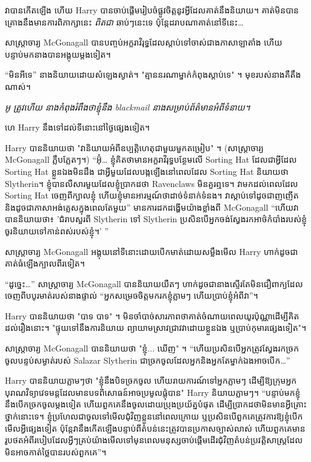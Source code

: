 វាបានកើតឡើង ហើយ Harry បានចាប់ផ្តើមរៀបចំផ្លូវចិត្តនូវអ្វីដែលគាត់នឹងនិយាយ។ គាត់​មិន​បាន​គ្រោង​នឹង​មាន​ការ​ពិភាក្សា​នេះ \emph{ពិតជា​} ឆាប់​ៗ​នេះ​ទេ ប៉ុន្តែ​ដរាបណា​គាត់​នៅ​ទីនេះ…

សាស្ត្រាចារ្យ McGonagall បានបញ្ចប់អក្ខរាវិរុទ្ធដែលស្តាប់ទៅចាស់ជាងភាសាឡាតាំង ហើយបន្ទាប់មកនាងបានអង្គុយម្តងទៀត។

“មិនអីទេ” នាងនិយាយដោយសំឡេងស្ងាត់។ "គ្មាននរណាម្នាក់កំពុងស្តាប់ទេ" ។ មុខរបស់នាងគឺតឹងណាស់។

\emph{អូ ត្រូវហើយ នាងកំពុងរំពឹងថាខ្ញុំនឹង blackmail នាងសម្រាប់ព័ត៌មានអំពីទំនាយ។}

ហេ Harry នឹងទៅដល់ទីនោះនៅថ្ងៃផ្សេងទៀត។

Harry បាននិយាយថា "វានិយាយអំពីឧប្បត្តិហេតុជាមួយមួកតម្រៀប" ។ (សាស្រ្តាចារ្យ McGonagall ភ្លឹបភ្លែតៗ។) “អ៊ុំ… ខ្ញុំគិតថាមានអក្ខរាវិរុទ្ធបន្ថែមលើ Sorting Hat ដែលជាអ្វីដែល Sorting Hat ខ្លួនឯងមិនដឹង ជាអ្វីមួយដែលបង្កឡើងនៅពេលដែល Sorting Hat និយាយថា Slytherin។ ខ្ញុំបានលឺសារមួយដែលខ្ញុំប្រាកដថា Ravenclaws មិនគួរឮទេ។ វាមកដល់ពេលដែល Sorting Hat ចេញពីក្បាលខ្ញុំ ហើយខ្ញុំមានអារម្មណ៍ថាដាច់ទំនាក់ទំនង។ វាស្តាប់ទៅដូចជាញញើត និងដូចជាភាសាអង់គ្លេសក្នុងពេលតែមួយ” មានការដកដង្ហើមយ៉ាងខ្លាំងពី McGonagall “ហើយវាបាននិយាយថា៖ 'ជំរាបសួរពី Slytherin ទៅ Slytherin ប្រសិនបើអ្នកចង់ស្វែងរកអាថ៌កំបាំងរបស់ខ្ញុំ ចូរនិយាយទៅកាន់ពស់របស់ខ្ញុំ។'{ }”

សាស្ត្រាចារ្យ McGonagall អង្គុយនៅទីនោះដោយបើកមាត់ដោយសម្លឹងមើល Harry ហាក់ដូចជាគាត់ធំឡើងក្បាលពីរទៀត។

“ដូច្នេះ…” សាស្ត្រាចារ្យ McGonagall បាននិយាយយឺតៗ ហាក់ដូចជានាងស្ទើរតែមិនជឿពាក្យដែលចេញពីបបូរមាត់របស់នាងផ្ទាល់ “អ្នកសម្រេចចិត្តមករកខ្ញុំភ្លាមៗ ហើយប្រាប់ខ្ញុំអំពីវា”។

Harry បាននិយាយថា "បាទ បាទ" ។ មិនចាំបាច់សារភាពថាគាត់ចំណាយពេលយូរប៉ុណ្ណាដើម្បីគិតដល់រឿងនោះ។ "ផ្ទុយ​ទៅ​នឹង​ការ​និយាយ ព្យាយាម​ស្រាវជ្រាវ​វា​ដោយ​ខ្លួន​ឯង ឬ​ប្រាប់​កុមារ​ផ្សេង​ទៀត"។

សាស្រ្តាចារ្យ McGonagall បាននិយាយថា "ខ្ញុំ... ឃើញ" ។ “ហើយ​ប្រសិន​បើ​អ្នក​ត្រូវ​ស្វែង​រក​ច្រក​ចូល​បន្ទប់​សម្ងាត់​របស់ Salazar Slytherin ជា​ច្រក​ចូល​ដែល​អ្នក​និង​អ្នក​តែ​ម្នាក់​ឯង​អាច​បើក…”

Harry បាននិយាយភ្លាមៗថា "ខ្ញុំនឹងបិទច្រកចូល ហើយរាយការណ៍ទៅអ្នកភ្លាមៗ ដើម្បីឱ្យក្រុមអ្នកបុរាណវិទ្យាវេទមន្តដែលមានបទពិសោធន៍អាចប្រមូលផ្តុំបាន" Harry និយាយភ្លាមៗ។ “បន្ទាប់មកខ្ញុំនឹងបើកច្រកចូលម្តងទៀត ហើយពួកគេនឹងចូលដោយប្រុងប្រយ័ត្នបំផុត ដើម្បីប្រាកដថាមិនមានអ្វីគ្រោះថ្នាក់នោះទេ។ ខ្ញុំប្រហែលជាចូលទៅមើលជុំវិញខ្លួននៅពេលក្រោយ ឬប្រសិនបើពួកគេត្រូវការឱ្យខ្ញុំបើកមើលអ្វីផ្សេងទៀត ប៉ុន្តែវានឹងកើតឡើងបន្ទាប់ពីតំបន់នេះត្រូវបានប្រកាសច្បាស់លាស់ ហើយពួកគេមានរូបថតអំពីរបៀបដែលអ្វីៗគ្រប់យ៉ាងមើលទៅមុនពេលមនុស្សចាប់ផ្តើមដើរជុំវិញតំបន់ប្រវត្តិសាស្ត្រដែលមិនអាចកាត់ថ្លៃបានរបស់ពួកគេ”។

